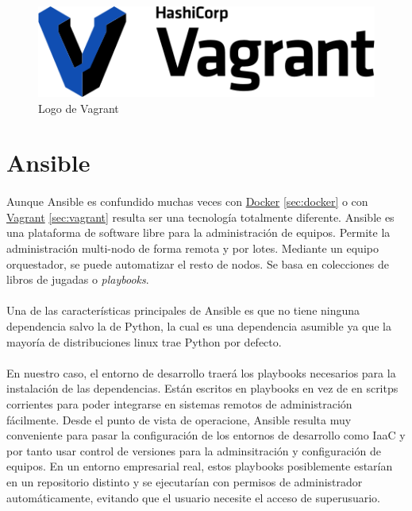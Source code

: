 \begin{figure}[H]
	\centering
	\includegraphics[width=0.50\linewidth]{imgs/vagrant-logo}
	\caption[Vagrant Logo]{Logo de Vagrant}
	\label{fig:vagrant}
\end{figure}

\section{Ansible}\label{sec:ansible}

\paragraph{}Aunque Ansible es confundido muchas veces con \hyperref[sec:docker]{Docker} \ref{sec:docker}
o con \hyperref[sec:vagrant]{Vagrant} \ref{sec:vagrant} resulta ser una tecnología
totalmente diferente. Ansible es una plataforma de software libre para la administración
de equipos. Permite la administración multi-nodo de forma remota y por lotes. Mediante
un equipo orquestador, se puede automatizar el resto de nodos. Se basa en colecciones
de libros de jugadas o \emph{playbooks}.

\paragraph{}Una de las características principales de Ansible es que no tiene ninguna
dependencia salvo la de Python, la cual es una dependencia asumible ya que la mayoría
de distribuciones linux trae Python por defecto.

\paragraph{}En nuestro caso, el entorno de desarrollo traerá los playbooks necesarios
para la instalación de las dependencias. Están escritos en playbooks en vez de en scritps
corrientes para poder integrarse en sistemas remotos de administración fácilmente. Desde
el punto de vista de operacione, Ansible resulta muy conveniente para pasar la configuración
de los entornos de desarrollo como \gls{IaaC} y por tanto usar control de versiones para
la adminsitración y configuración de equipos. En un entorno empresarial real, estos
playbooks posiblemente estarían en un repositorio distinto y se ejecutarían con permisos
de administrador automáticamente, evitando que el usuario necesite el acceso de superusuario.

